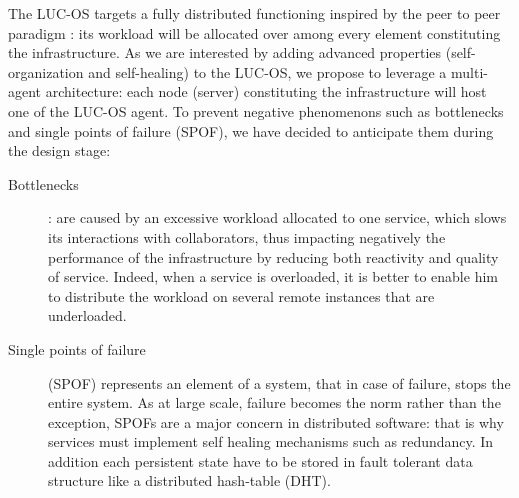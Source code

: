 The LUC-OS targets a fully distributed functioning inspired by the peer to peer
paradigm : its workload will be allocated over among every element constituting
the infrastructure. As we are interested by adding advanced properties 
(self-organization and self-healing) to the LUC-OS, we propose to leverage a 
multi-agent architecture: each node (server) constituting the infrastructure 
will host one of the LUC-OS agent. To prevent negative phenomenons such as
bottlenecks and single points of failure (SPOF), we have decided to anticipate
them during the design stage:

\begin{description}

  \item [Bottlenecks] : are caused by an excessive workload allocated to one 
  service, which slows its interactions with collaborators, thus impacting
  negatively the performance of the infrastructure by reducing both reactivity 
  and quality of service. Indeed, when a service is overloaded, it is better to 
  enable him to distribute the workload on several remote instances that are
  underloaded.

  \item [Single points of failure] (SPOF) represents an element of a system, 
  that in case of failure, stops the entire system. As at large scale, failure 
  becomes the norm rather than the exception, SPOFs are a major concern in
  distributed software: that is why services must implement self healing 
  mechanisms such as redundancy. In addition each persistent state have to be 
  stored in fault tolerant data structure like a distributed hash-table (DHT).

\end{description}

